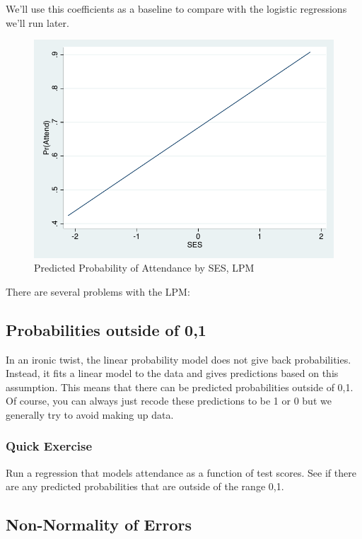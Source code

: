 \documentclass[12pt]{article}
\begin{document}
We'll use this coefficients as a baseline to compare with the logistic regressions we'll run later. 


\begin{figure}[h]
  \centering
  \includegraphics[width=\textwidth]{lpm}
  \caption{Predicted Probability of Attendance by SES, LPM}
\end{figure}



There are several problems with the LPM:


\subsection{Probabilities outside of 0,1}

In an ironic twist, the linear probability model does not give back
probabilities. Instead, it fits a linear model to the data and gives
predictions based on this assumption. This means that there can be
predicted probabilities outside of 0,1. Of course, you can always just
recode these predictions to be 1 or 0 but we generally try to avoid
making up data. 


\subsubsection{Quick Exercise}

Run a regression that models attendance as a function of test
scores. See if there are any predicted probabilities that are outside of the range 0,1. 


\subsection{Non-Normality of Errors}
\end{document}
